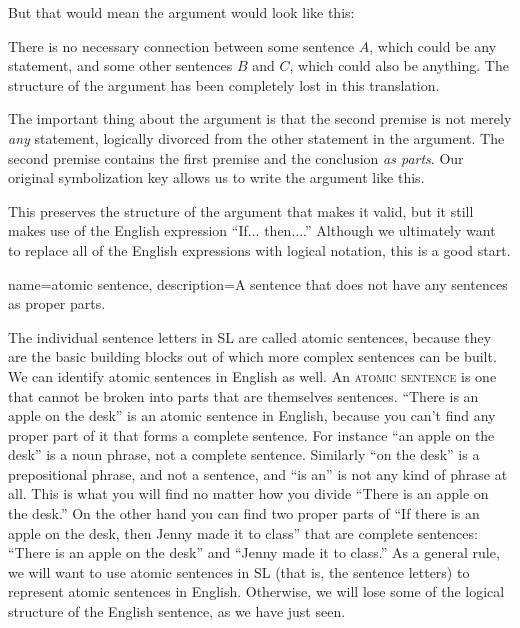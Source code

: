 But that would mean the argument would look like this:

\begin{kormanize}
\end{kormanize}

There is no necessary connection between some sentence $A$, which could be any statement, and some other sentences $B$ and $C$, which could also be anything. The structure of the argument has been completely lost in this translation.

The important thing about the argument is that the second premise is not merely \emph{any} statement, logically divorced from the other statement in the argument. The second premise contains the first premise and the conclusion \emph{as parts}. Our original symbolization key allows us to write the argument like this.

\begin{kormanize}
\end{kormanize}

This preserves the structure of the argument that makes it valid, but it still makes use of the English expression ``If$\ldots$ then$\ldots$.'' Although we ultimately want to replace all of the English expressions with logical notation, this is a good start.

{
name=atomic sentence,
description={A sentence that does not have any sentences as proper parts.}
}

The individual sentence letters in SL are called atomic sentences, because they are the basic building blocks out of which more complex sentences can be built. We can identify atomic sentences in English as well. An \textsc{\gls{atomic sentence}} \label{def:atomic_sentence} is one that cannot be broken into parts that are themselves sentences. ``There is an apple on the desk'' is an atomic sentence in English, because you can't find any proper part of it that forms a complete sentence. For instance ``an apple on the desk'' is a noun phrase, not a complete sentence. Similarly ``on the desk'' is a prepositional phrase, and not a sentence, and ``is an'' is not any kind of phrase at all. This is what you will find no matter how you divide ``There is an apple on the desk.'' On the other hand you can find two proper parts of ``If there is an apple on the desk, then Jenny made it to class'' that are complete sentences: ``There is an apple on the desk'' and ``Jenny made it to class.'' As a general rule, we will want to use atomic sentences in SL (that is, the sentence letters) to represent atomic sentences in English. Otherwise, we will lose some of the logical structure of the English sentence, as we have just seen.

